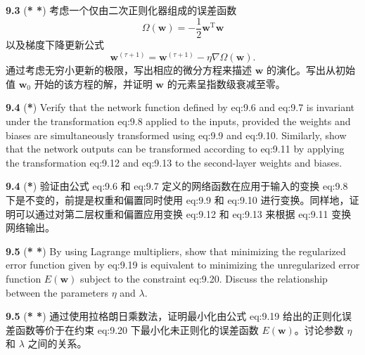 \documentclass{article}
\begin{document}
\textbf{9.3} (\textbf{* *}) 考虑一个仅由二次正则化器组成的误差函数
\[
\Omega(\mathbf{w}) = -\frac{1}{2} \mathbf{w}^\mathrm{T} \mathbf{w}
\]
以及梯度下降更新公式
\[
\mathbf{w}^{(\tau+1)} = \mathbf{w}^{(\tau+1)} - \eta \nabla \Omega(\mathbf{w}).
\]
通过考虑无穷小更新的极限，写出相应的微分方程来描述 $\mathbf{w}$ 的演化。写出从初始值 $\mathbf{w}_0$ 开始的该方程的解，并证明 $\mathbf{w}$ 的元素呈指数级衰减至零。

\textbf{9.4} (\textbf{*}) Verify that the network function defined by {eq:9.6} and {eq:9.7} is invariant under the transformation {eq:9.8} applied to the inputs, provided the weights and biases are simultaneously transformed using {eq:9.9} and {eq:9.10}. Similarly, show that the network outputs can be transformed according to {eq:9.11} by applying the transformation {eq:9.12} and {eq:9.13} to the second-layer weights and biases.

\textbf{9.4} (\textbf{*}) 验证由公式 {eq:9.6} 和 {eq:9.7} 定义的网络函数在应用于输入的变换 {eq:9.8} 下是不变的，前提是权重和偏置同时使用 {eq:9.9} 和 {eq:9.10} 进行变换。同样地，证明可以通过对第二层权重和偏置应用变换 {eq:9.12} 和 {eq:9.13} 来根据 {eq:9.11} 变换网络输出。

\textbf{9.5} (\textbf{* *}) By using Lagrange multipliers, show that minimizing the regularized error function given by {eq:9.19} is equivalent to minimizing the unregularized error function $E(\mathbf{w})$ subject to the constraint {eq:9.20}. Discuss the relationship between the parameters $\eta$ and $\lambda$.

\textbf{9.5} (\textbf{* *}) 通过使用拉格朗日乘数法，证明最小化由公式 {eq:9.19} 给出的正则化误差函数等价于在约束 {eq:9.20} 下最小化未正则化的误差函数 $E(\mathbf{w})$。讨论参数 $\eta$ 和 $\lambda$ 之间的关系。
\end{document}
